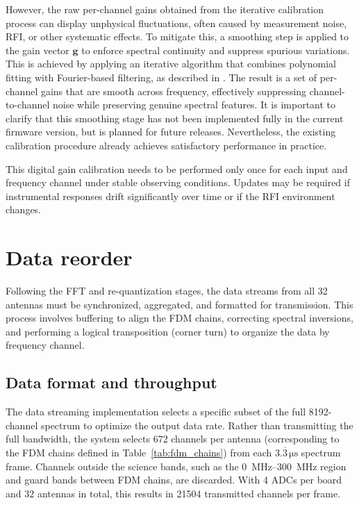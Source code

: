 However, the raw per-channel gains obtained from the iterative calibration process can display unphysical fluctuations, often caused by measurement noise, RFI, or other systematic effects. To mitigate this, a smoothing step is applied to the gain vector $\mathbf{g}$ to enforce spectral continuity and suppress spurious variations. This is achieved by applying an iterative algorithm that combines polynomial fitting with Fourier-based filtering, as described in \citet{Hsyu2016}. The result is a set of per-channel gains that are smooth across frequency, effectively suppressing channel-to-channel noise while preserving genuine spectral features. It is important to clarify that this smoothing stage has not been implemented fully in the current firmware version, but is planned for future releases. Nevertheless, the existing calibration procedure already achieves satisfactory performance in practice.

This digital gain calibration needs to be performed only once for each input and frequency channel under stable observing conditions. Updates may be required if instrumental responses drift significantly over time or if the RFI environment changes.

\section{Data reorder}
Following the FFT and re-quantization stages, the data streams from all 32 antennas must be synchronized, aggregated, and formatted for transmission. This process involves buffering to align the FDM chains, correcting spectral inversions, and performing a logical transposition (corner turn) to organize the data by frequency channel.

\subsection{Data format and throughput}
The data streaming implementation selects a specific subset of the full \num{8192}-channel spectrum to optimize the output data rate. Rather than transmitting the full bandwidth, the system selects \num{672} channels per antenna (corresponding to the FDM chains defined in Table~\ref{tab:fdm_chains}) from each $3.\overline{3}\,\unit{\micro\second}$ spectrum frame. Channels outside the science bands, such as the \qtyrange{0}{300}{\mega\hertz} region and guard bands between FDM chains, are discarded. With 4 ADCs per board and 32 antennas in total, this results in \num{21504} transmitted channels per frame. 

